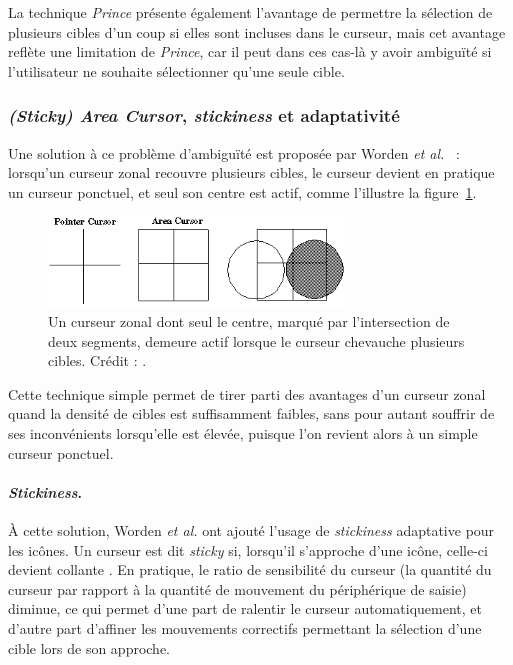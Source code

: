 	La technique \emph{Prince} présente également l'avantage de permettre la sélection de plusieurs cibles d'un coup si elles sont incluses dans le curseur, mais cet avantage reflète une limitation de \emph{Prince}, car il peut dans ces cas-là y avoir ambiguïté si l'utilisateur ne souhaite sélectionner qu'une seule cible.
	
	\subsubsection{\emph{(Sticky) Area Cursor}, \emph{stickiness} et adaptativité}
	Une solution à ce problème d'ambiguïté est proposée par Worden \emph{et al.}~\cite{worden1997making} : lorsqu'un curseur zonal recouvre plusieurs cibles, le curseur devient en pratique un curseur ponctuel, et seul son centre est actif, comme l'illustre la figure~\ref{fig:areaCursor}.
	
	\begin{figure}[!htb]
		\centering
		\includegraphics[width=0.70\textwidth]{figures/ch2/areaCursor}
		\caption[\emph{Area Cursor} avec \emph{hot spot}]{Un curseur zonal dont seul le centre, marqué par l'intersection de deux segments, demeure actif lorsque le curseur chevauche plusieurs cibles. Crédit : \cite{worden1997making}.}
		\label{fig:areaCursor}
	\end{figure}
	
	Cette technique simple permet de tirer parti des avantages d'un curseur zonal quand la densité de cibles est suffisamment faibles, sans pour autant souffrir de ses inconvénients lorsqu'elle est élevée, puisque l'on revient alors à un simple curseur ponctuel.
	
	\paragraph{\emph{Stickiness}.}
	À cette solution, Worden \emph{et al.} ont ajouté l'usage de \emph{stickiness} adaptative pour les icônes. Un curseur est dit \emph{sticky} si, lorsqu'il s'approche d'une icône, celle-ci devient \og collante \fg{}. En pratique, le ratio de sensibilité du curseur (la quantité du curseur par rapport à la quantité de mouvement du périphérique de saisie) diminue, ce qui permet d'une part de ralentir le curseur automatiquement, et d'autre part d'affiner les mouvements correctifs permettant la sélection d'une cible lors de son approche.
	
